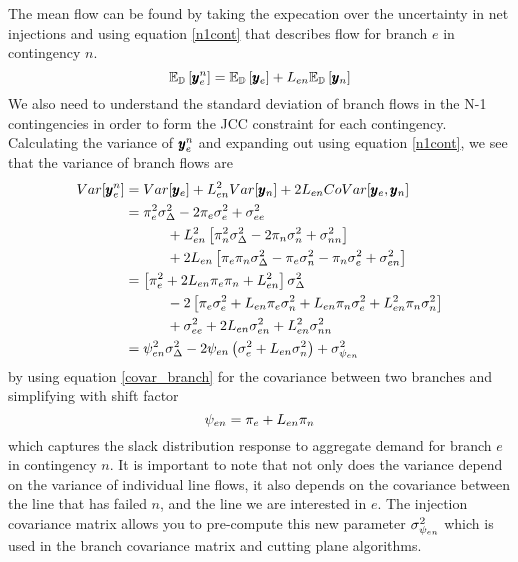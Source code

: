 The mean flow can be found by taking the expecation over the uncertainty in net injections and using equation \ref{n1cont} that describes flow for branch $e$ in contingency $n$.
\begin{equation}
\mathbb{E}_{\mathbb{D}} \left[ \pmb{y}_e^n \right] =  \mathbb{E}_{\mathbb{D}} \left[ \pmb{y}_e \right]  + L_{en} \mathbb{E}_{\mathbb{D}} \left[ \pmb{y}_n \right] 
\end{equation}
We also need to understand the standard deviation of branch flows in the N-1 contingencies in order to form the JCC constraint for each contingency.  Calculating the variance of $\pmb{y}_e^n$ and expanding out using equation \ref{n1cont}, we see that the variance of branch flows are
\begin{subequations}
\begin{align}
 Var[\pmb{y}_e^n] &= Var[\pmb{y}_e] + L^2_{e n} Var[ \pmb{y}_n ] + 2 L_{e n} CoVar[ \pmb{y}_e, \pmb{y}_n ] \\
 &= \pi_e^2 \sigma_\Delta^2 - 2 \pi_e \sigma_e^2 + \sigma_{ee}^2 \nonumber \\
 &\hspace{30pt} + L_{en}^2 \left[ \pi_n^2 \sigma_\Delta^2 - 2 \pi_n \sigma_n^2 + \sigma_{nn}^2 \right] \nonumber \\
 &\hspace{30pt}+ 2 L_{en} \left[ \pi_{e} \pi_{n} \sigma_\Delta^2 -  \pi_{e} \sigma_{n}^2 - \pi_{n} \sigma_{e}^2   + \sigma_{e n}^2 \right]  \\
 &= \left[ \pi_e^2 + 2 L_{en} \pi_e \pi_n + L_{en}^2 \right] \sigma_\Delta^2 \nonumber\\
 &\hspace{30pt} - 2 \left[ \pi_e \sigma_e^2 + L_{en} \pi_e \sigma_n^2 + L_{en} \pi_n \sigma_e^2 + L_{en}^2 \pi_n \sigma_n^2 \right]  \nonumber \\
&\hspace{30pt} +  \sigma_{ee}^2 + 2 L_{en} \sigma_{en}^2 + L_{en}^2 \sigma_{nn}^2 \\
 &=\psi_{en}^2 \sigma_\Delta^2 - 2 \psi_{en} \left( \sigma_e^2 + L_{en} \sigma_n^2 \right) + \sigma^2_{\psi_{en}}
\end{align}
\end{subequations}
by using equation \ref{covar_branch} for the covariance between two branches and simplifying with shift factor
\begin{equation}
\psi_{en} = \pi_e + L_{en} \pi_n
\end{equation}
 which captures the slack distribution response to aggregate demand for branch $e$ in contingency $n$.  It is important to note that not only does the variance depend on the variance of individual line flows, it also depends on the covariance between the line that has failed $n$, and the line we are interested in $e$.  The injection covariance matrix allows you to pre-compute this new parameter $\sigma^2_{\psi_{en}}$ which is used in the branch covariance matrix and cutting plane algorithms.
